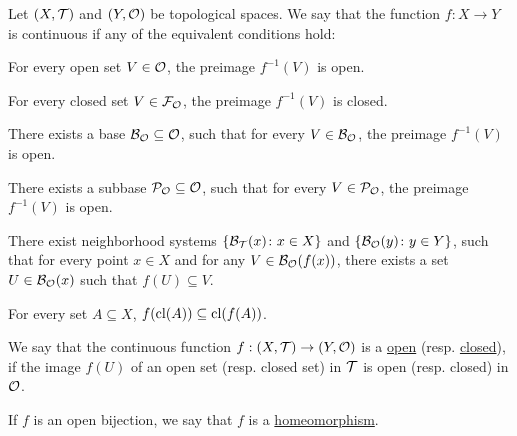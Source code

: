 \begin{definition}\label{def:continuous_function}\cite[33]{Lectures:general_topology}
  Let $(X, \mathcal T)$ and $(Y, \mathcal O)$ be topological spaces. We say that the function $f: X \to Y$ is continuous if any of the equivalent conditions hold:
  \begin{defenum}
    \item\label{def:continuous_function/direct} For every open set $V \in \mathcal O$, the preimage $f^{-1}(V)$ is open.
    \item\label{def:continuous_function/closed} For every closed set $V \in \mathcal F_{\mathcal O}$, the preimage $f^{-1}(V)$ is closed.
    \item\label{def:continuous_function/base} There exists a base $\mathcal B_{\mathcal O} \subseteq \mathcal O$, such that for every $V \in \mathcal B_{\mathcal O}$, the preimage $f^{-1}(V)$ is open.
    \item\label{def:continuous_function/subbase} There exists a subbase $\mathcal P_{\mathcal O} \subseteq \mathcal O$, such that for every $V \in \mathcal P_{\mathcal O}$, the preimage $f^{-1}(V)$ is open.
    \item\label{def:continuous_function/local_base} There exist neighborhood systems $\{ \mathcal B_{\mathcal T}(x) \colon x \in X \}$ and $\{ \mathcal B_{\mathcal O}(y) \colon y \in Y \}$, such that for every point $x \in X$ and for any $V \in \mathcal B_{\mathcal O}(f(x))$, there exists a set $U \in \mathcal B_{\mathcal O}(x)$ such that $f(U) \subseteq V$.
    \item\label{def:continuous_function/closure} For every set $A \subseteq X$, $f(\operatorname{cl}(A)) \subseteq \operatorname{cl}(f(A))$.
  \end{defenum}
\end{definition}

\begin{definition}\label{def:homeomorphism}
  We say that the continuous function $f: (X, \mathcal T) \to (Y, \mathcal O)$ is a \uline{open} (resp. \uline{closed}), if the image $f(U)$ of an open set (resp. closed set) in $\mathcal T$ is open (resp. closed) in $\mathcal O$.

  If $f$ is an open bijection, we say that $f$ is a \uline{homeomorphism}.
\end{definition}
